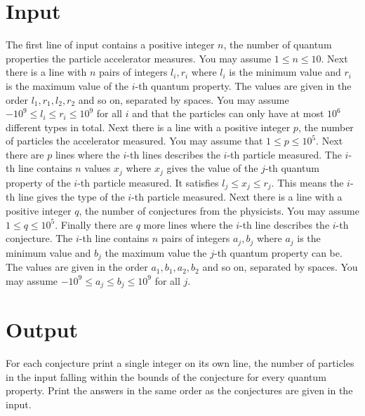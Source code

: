 \section*{Input}
The first line of input contains a positive integer $n$,
the number of quantum properties the particle accelerator
measures. You may assume $1 \leq n \leq 10$.
Next there is a line with $n$ pairs of integers $l_i, r_i$
where $l_i$ is the minimum value and $r_i$ is the maximum
value of the $i$-th quantum property. The values are given
in the order $l_1, r_1, l_2, r_2$ and so on, separated by
spaces. You may assume $-10^9 \leq l_i \leq r_i \leq 10^9$
for all $i$ and that the particles can only have at most
$10^6$ different types in total.
Next there is a line with a positive integer $p$, the number
of particles the accelerator measured. You may assume
that $1 \leq p \leq 10^5$.
Next there are $p$ lines where the $i$-th lines describes
the $i$-th particle measured.
The $i$-th line contains $n$ values $x_j$ where $x_j$
gives the value of the $j$-th quantum property of the
$i$-th particle measured. It satisfies 
$l_j \leq x_j \leq r_j$. This means the $i$-th line gives
the type of the $i$-th particle measured.
Next there is a line with a positive integer $q$, the
number of conjectures from the physicists. You may assume
$1 \leq q \leq 10^5$.
Finally there are $q$ more lines where the $i$-th line
describes the $i$-th conjecture.
The $i$-th line contains $n$ pairs of integers $a_j, b_j$
where $a_j$ is the minimum value and $b_j$ the maximum value
the $j$-th quantum property can be. The values are given in
the order $a_1, b_1, a_2, b_2$ and so on, separated by spaces.
You may assume $-10^9 \leq a_j \leq b_j \leq 10^9$ for all
$j$.

\section*{Output}
For each conjecture print a single integer on its own line,
the number of particles in the input falling within the
bounds of the conjecture for every quantum property. 
Print the answers in the same order as the conjectures are
given in the input.
